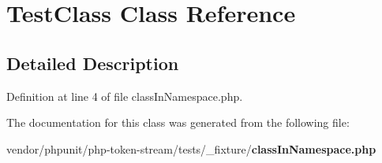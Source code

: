 \section{Test\+Class Class Reference}
\label{class_foo_1_1_bar_1_1_test_class}


\subsection{Detailed Description}


Definition at line 4 of file class\+In\+Namespace.\+php.



The documentation for this class was generated from the following file\+:\begin{DoxyCompactItemize}
\item 
vendor/phpunit/php-\/token-\/stream/tests/\+\_\+fixture/{\bf class\+In\+Namespace.\+php}\end{DoxyCompactItemize}
